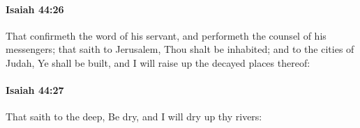 		\paragraph{Isaiah 44:26} %
			\label{ISAIAH-44-26}

			That confirmeth the word of his servant, and performeth the counsel of his messengers; that saith to Jerusalem, Thou shalt be inhabited; and to the cities of Judah, Ye shall be built, and I will raise up the decayed places thereof:


		\paragraph{Isaiah 44:27} %
			\label{ISAIAH-44-27}

			That saith to the deep, Be dry, and I will dry up thy rivers:


